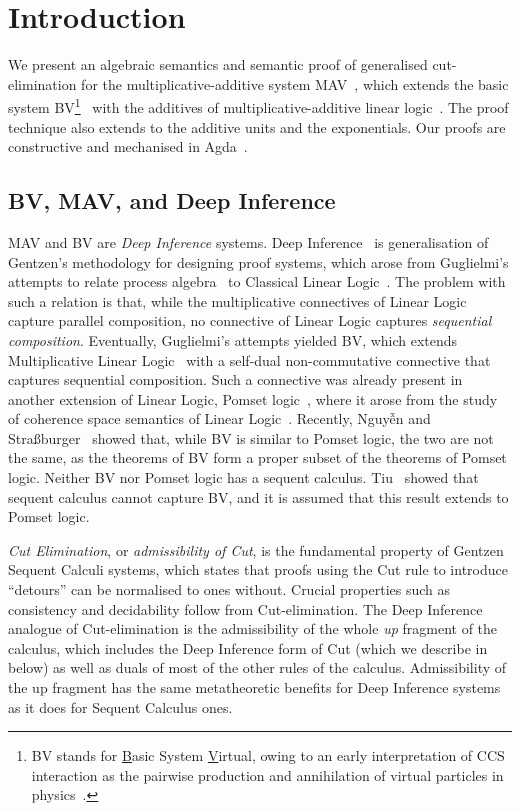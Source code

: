 \section{Introduction}\label{sec:introduction}

We present an algebraic semantics and semantic proof of generalised cut-elimination for the multiplicative-additive system MAV~\cite{Horne15:mav}, which extends the basic system BV\footnote{
      BV stands for \underline{B}asic System \underline{V}irtual, owing to an early interpretation of CCS interaction as the pairwise production and annihilation of virtual particles in physics~\cite[]{Horne15:mav}.
}~\cite{Guglielmi99:bv,Guglielmi07:sis} with the additives of multiplicative-additive linear logic~\cite[MALL]{Girard87:ll}. The proof technique also extends to the additive units and the exponentials.
Our proofs are constructive and mechanised in Agda~\cite{Agda264}.

\subsection{BV, MAV, and Deep Inference}

MAV and BV are \emph{Deep Inference} systems. Deep Inference~\cite{Guglielmi14:di} is generalisation of Gentzen's methodology for designing proof systems, which arose from Guglielmi's attempts to relate process algebra~\cite[CCS]{Milner80:CCS,Milner89:CC} to Classical Linear Logic~\cite[CLL]{Girard87:ll}.
The problem with such a relation is that, while the multiplicative connectives of Linear Logic capture parallel composition, no connective of Linear Logic captures \emph{sequential composition}.
Eventually, Guglielmi's attempts yielded BV, which extends Multiplicative Linear Logic~\cite[MLL]{Girard87:ll} with a self-dual non-commutative connective that captures sequential composition.
Such a connective was already present in another extension of Linear Logic, Pomset logic~\cite{Retore97:pomset}, where it arose from the study of coherence space semantics of Linear Logic~\cite[]{GirardTL89:proofs}.
Recently, Nguyễn and Stra{\ss}burger~\cite{NguyenS22:bvisnotpl} showed that, while BV is similar to Pomset logic, the two are not the same, as the theorems of BV form a proper subset of the theorems of Pomset logic.
Neither BV nor Pomset logic has a sequent calculus. Tiu~\cite{Tiu06:sisii} showed that sequent calculus cannot capture BV, and it is assumed that this result extends to Pomset logic.

\emph{Cut Elimination}, or \emph{admissibility of Cut}, is the fundamental property of Gentzen Sequent Calculi systems, which states that proofs using the Cut rule to introduce ``detours'' can be normalised to ones without. Crucial properties such as consistency and decidability follow from Cut-elimination. The Deep Inference analogue of Cut-elimination is the admissibility of the whole \emph{up} fragment of the calculus, which includes the Deep Inference form of Cut (which we describe in  below) as well as duals of most of the other rules of the calculus. Admissibility of the up fragment has the same metatheoretic benefits for Deep Inference systems as it does for Sequent Calculus ones.

